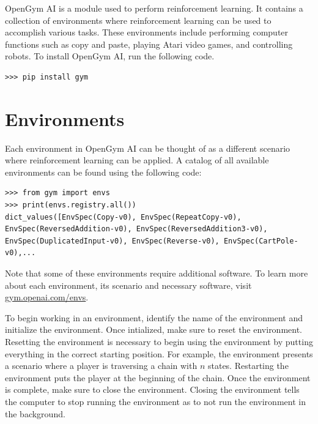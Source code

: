 

OpenGym AI is a module used to perform reinforcement learning.
It contains a collection of environments where reinforcement learning can be used to accomplish various tasks.
These environments include performing computer functions such as copy and paste, playing Atari video
games, and controlling robots.
To install OpenGym AI, run the following code.

\begin{lstlisting}
>>> pip install gym
\end{lstlisting}

\section*{Environments}

Each environment in OpenGym AI can be thought of as a different scenario where reinforcement learning can be applied.
A catalog of all available environments can be found using the following code:

\begin{lstlisting}
>>> from gym import envs
>>> print(envs.registry.all())
dict_values([EnvSpec(Copy-v0), EnvSpec(RepeatCopy-v0), EnvSpec(ReversedAddition-v0), EnvSpec(ReversedAddition3-v0), EnvSpec(DuplicatedInput-v0), EnvSpec(Reverse-v0), EnvSpec(CartPole-v0),...
\end{lstlisting}
Note that some of these environments require additional software.
To learn more about each environment, its scenario and necessary software, visit \url{gym.openai.com/envs}.

To begin working in an environment, identify the name of the environment and initialize the environment.
Once intialized, make sure to reset the environment.
Resetting the environment is necessary to begin using the environment by putting everything in the correct starting position.
For example, the environment  presents a scenario where a player is traversing a chain with $n$ states.
Restarting the environment puts the player at the beginning of the chain.
Once the environment is complete, make sure to close the environment.
Closing the environment tells the computer to stop running the environment as to not run the environment in the background.

